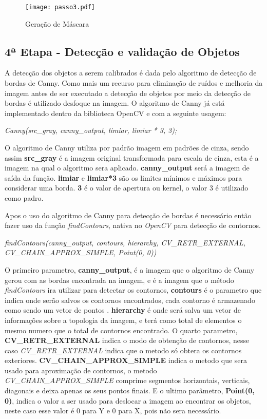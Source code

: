 \begin{figure}[H]
			\centering
			\texttt{[image: passo3.pdf]}
			\caption{Geração de Máscara}
			\label{Configuracao}
		\end{figure}		


\subsection{4ª Etapa - Detecção e validação de Objetos}
A detecção dos objetos a serem calibrados é dada pelo algoritmo de detecção de bordas de Canny. Como mais um recurso para eliminação de ruídos e melhoria da imagem antes de ser executado a detecção de objetos por meio da detecção de bordas é utilizado desfoque na imagem. O algoritmo de Canny já está implementado dentro da biblioteca OpenCV e com a seguinte usagem:
\begin{center}
\centering \textit{  Canny(src\_gray, canny\_output, limiar, limiar * 3, 3);}
\end{center}
O algoritmo de Canny utiliza por padrão imagem em padrões de cinza, sendo assim \textbf{src\_gray} é a imagem original transformada para escala de cinza, esta é a imagem na qual o algoritmo sera aplicado. \textbf{canny\_output} será a imagem de saída da função.
\textbf{limiar} e \textbf{limiar*3} são os limites mínimos e máximos para considerar uma borda. \textbf{3} é o valor de apertura ou kernel, o valor 3 é utilizado como padro.

Apos o uso do algoritmo de Canny para detecção de bordas é necessário então fazer uso da função \textit{findContours}, nativa no \textit{OpenCV} para detecção de contornos.
\begin{center}
\centering \textit{ findContours(canny\_output, contours, hierarchy, CV\_RETR\_EXTERNAL, CV\_CHAIN\_APPROX\_SIMPLE, Point(0, 0))}
\end{center}

O primeiro parametro, \textbf{canny\_output}, é a imagem que o algoritmo de Canny gerou com as bordas encontrada na imagem, e é a imagem que o método \textit{findContours} ira utilizar para detectar os contornos, \textbf{contours} é o parametro que indica onde serão salvos os contornos encontrados, cada contorno é armazenado como sendo um vetor de pontos \cite{OpenCV}. \textbf{hierarchy} é onde será salva um vetor de informações sobre a topologia da imagem, e terá como total de elementos o mesmo numero que o total de contornos encontrado\cite{OpenCV}. O quarto parametro, \textbf{CV\_RETR\_EXTERNAL} indica o modo de obtenção de contornos, nesse caso \textit{CV\_RETR\_EXTERNAL} indica que o metodo só obtera os contornos exteriores\cite{OpenCV}. \textbf{CV\_CHAIN\_APPROX\_SIMPLE} indica o metodo que sera usado para aproximação de contornos, o metodo \textit{CV\_CHAIN\_APPROX\_SIMPLE} comprime segmentos horizontais, verticais, diagonais e deixa apenas os seus pontos finais\cite{OpenCV}. E o ultimo parâmetro, \textbf{Point(0, 0)}, indica o valor a ser usado para deslocar a imagem ao encontrar os objetos, neste caso esse valor é 0 para Y e 0 para X, pois não sera necessário. 

